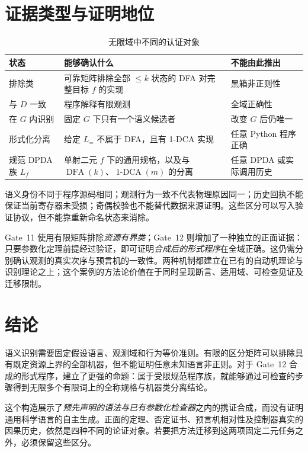 \documentclass[11pt,a4paper,UTF8,fontset=none]{ctexart}
\newcommand{\DFA}{\operatorname{DFA}}
\newcommand{\oneDCA}{\operatorname{1\text{-}DCA}}
\begin{document}
\section{证据类型与证明地位}

\begin{table}[htbp]
\centering\small
\caption{无限域中不同的认证对象}\label{tab:status}
\renewcommand{\arraystretch}{1.12}
\begin{tabularx}{\linewidth}{@{}>{\raggedright\arraybackslash}p{2.55cm}>{\raggedright\arraybackslash}X>{\raggedright\arraybackslash}p{3.05cm}@{}}
\toprule
\textbf{状态} & \textbf{能够确认什么} & \textbf{不能由此推出}\\
\midrule
排除类 & 可靠矩阵排除全部 $\le k$ 状态的 DFA 对完整目标 $f$ 的实现 & 黑箱非正则性\\
与 $D$ 一致 & 程序解释有限观测 & 全域正确性\\
在 $G$ 内识别 & 固定 $G$ 下只有一个语义候选者 & 改变 $G$ 后仍唯一\\
形式化分离 & 给定 $L_=$ 不属于 DFA，且有 1-DCA 实现 & 任意 Python 程序正确\\
规范 DPDA 族 $L_f$ & 单射二元 $f$ 下的通用规格，以及与 $\DFA(k)$、$\oneDCA(m)$ 的分离 & 任意 DPDA 或实际调用历史\\
\bottomrule
\end{tabularx}
\end{table}

语义身份不同于程序源码相同；观测行为一致不代表物理原因同一；历史回执不能保证当前寄存器未受损；奇偶校验也不能替代数据来源证明。这些区分可以写入验证协议，但不能靠重新命名状态来消除。

Gate~11 使用有限矩阵排除\emph{资源有界类}；Gate~12 则增加了一种独立的正面证据：只要参数化定理前提经过验证，即可证明\emph{合成后的形式程序}在全域正确。这仍需分别确认观测的真实次序与预言机的一致性。两种机制都建立在已有的自动机理论与识别理论之上；这个案例的方法论价值在于同时呈现断言、适用域、可检查见证及迁移限制。

\section{结论}

语义识别需要固定假设语言、观测域和行为等价准则。有限的区分矩阵可以排除具有既定资源上界的全部机器，但不能证明任意未知语言非正则。对于 Gate~12 合成的形式程序，建立了更强的命题：属于受限规范程序族，就能够通过可检查的步骤得到无限多个有限词上的全称规格与机器类分离结论。

这个构造展示了\emph{预先声明的语法与已有参数化检查器}之内的携证合成，而没有证明通用科学语言的自主生成。正面的定理、否定证书、预言机相对性及控制器真实的因果历史，依然是四种不同的论证对象。若要把方法迁移到这两项固定二元任务之外，必须保留这些区分。
\end{document}
